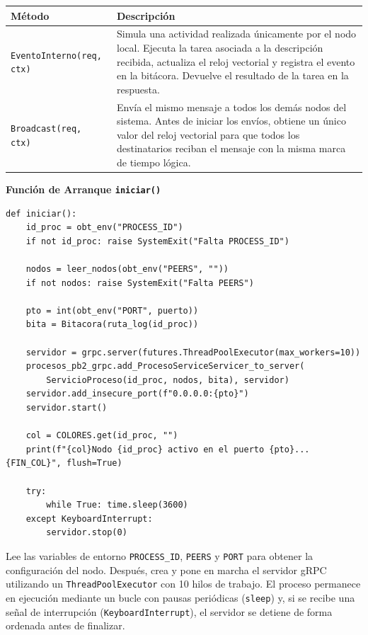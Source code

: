 \documentclass[letterpaper,11pt]{article}
\begin{document}
\begin{center}
\begin{tabular}{>{\ttfamily}l p{9cm}}
\toprule
\textbf{Método} & \textbf{Descripción} \\
\midrule
\texttt{EventoInterno(req, ctx)} &
  Simula una actividad realizada únicamente por el nodo local. Ejecuta la
  tarea asociada a la descripción recibida, actualiza el reloj vectorial y
  registra el evento en la bitácora. Devuelve el resultado de la tarea en
  la respuesta. \\[4pt]

\texttt{Broadcast(req, ctx)} &
  Envía el mismo mensaje a todos los demás nodos del sistema. Antes de
  iniciar los envíos, obtiene un único valor del reloj vectorial para que
  todos los destinatarios reciban el mensaje con la misma marca de tiempo
  lógica. \\
\bottomrule
\end{tabular}
\end{center}

\textbf{Función de Arranque \texttt{iniciar()}}


\begin{lstlisting}[style=python, caption={process.py — Arranque del servidor gRPC}]
def iniciar():
    id_proc = obt_env("PROCESS_ID")
    if not id_proc: raise SystemExit("Falta PROCESS_ID")
 
    nodos = leer_nodos(obt_env("PEERS", ""))
    if not nodos: raise SystemExit("Falta PEERS")
 
    pto = int(obt_env("PORT", puerto))
    bita = Bitacora(ruta_log(id_proc))
 
    servidor = grpc.server(futures.ThreadPoolExecutor(max_workers=10))
    procesos_pb2_grpc.add_ProcesoServiceServicer_to_server(
        ServicioProceso(id_proc, nodos, bita), servidor)
    servidor.add_insecure_port(f"0.0.0.0:{pto}")
    servidor.start()
 
    col = COLORES.get(id_proc, "")
    print(f"{col}Nodo {id_proc} activo en el puerto {pto}...{FIN_COL}", flush=True)
 
    try:
        while True: time.sleep(3600)
    except KeyboardInterrupt:
        servidor.stop(0)
\end{lstlisting}
 
Lee las variables de entorno \texttt{PROCESS\_ID}, \texttt{PEERS} y
\texttt{PORT} para obtener la configuración del nodo. Después, crea y
pone en marcha el servidor gRPC utilizando un \texttt{ThreadPoolExecutor}
con 10 hilos de trabajo. El proceso permanece en ejecución mediante un
bucle con pausas periódicas (\texttt{sleep}) y, si se recibe una señal de
interrupción (\texttt{KeyboardInterrupt}), el servidor se detiene de forma
ordenada antes de finalizar.
\end{document}
